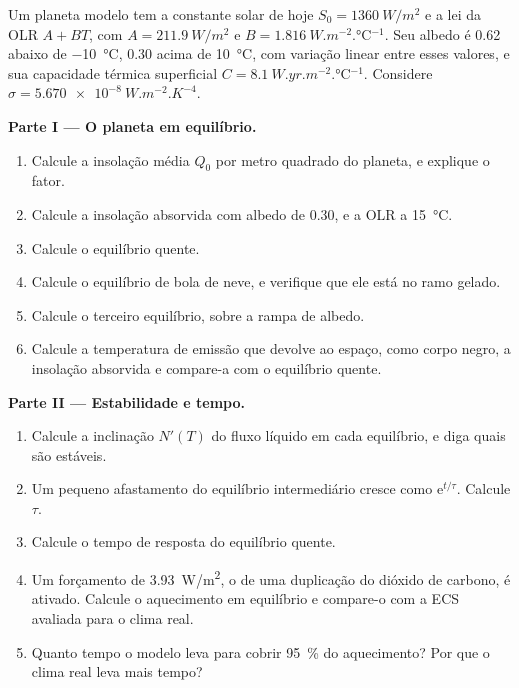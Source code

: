 \begin{problem}
\label{pb:b3:climate-models:1}
Um planeta modelo tem a constante solar de hoje $S_0 = \qty{1360}{W/m^2}$ e a
lei da OLR $A + BT$, com $A = \qty{211.9}{W/m^2}$ e $B =
\qty{1.816}{W.m^{-2}.\celsius^{-1}}$. Seu albedo é 0.62 abaixo de
\qty{-10}{\celsius}, 0.30 acima de \qty{+10}{\celsius}, com variação linear entre esses valores, e
sua capacidade térmica superficial $C = \qty{8.1}{W.yr.m^{-2}.\celsius^{-1}}$. Considere
$\sigma = \qty{5.670e-8}{W.m^{-2}.K^{-4}}$.

\medskip\noindent\textbf{Parte I --- O planeta em equilíbrio.}
\begin{enumerate}
\item Calcule a insolação média $Q_0$ por metro quadrado do planeta, e
  explique o fator.
\item Calcule a insolação absorvida com albedo de 0.30, e a OLR a
  \qty{15}{\celsius}.
\item Calcule o equilíbrio quente.
\item Calcule o equilíbrio de bola de neve, e verifique que ele está no
  ramo gelado.
\item Calcule o terceiro equilíbrio, sobre a rampa de albedo.
\item Calcule a temperatura de emissão que devolve ao espaço, como corpo negro, a insolação absorvida
  e compare-a com o equilíbrio quente.
\end{enumerate}

\medskip\noindent\textbf{Parte II --- Estabilidade e tempo.}
\begin{enumerate}[resume]
\item Calcule a inclinação $N'(T)$ do fluxo líquido em cada equilíbrio, e diga
  quais são estáveis.
\item Um pequeno afastamento do equilíbrio intermediário cresce como $\mathrm
  e^{t/\tau}$. Calcule $\tau$.
\item Calcule o tempo de resposta do equilíbrio quente.
\item Um forçamento de \qty{3.93}{W/m^2}, o de uma duplicação do dióxido de carbono,
  é ativado. Calcule o aquecimento em equilíbrio e compare-o com
  a ECS avaliada para o clima real.
\item Quanto tempo o modelo leva para cobrir \qty{95}{\percent} do
  aquecimento? Por que o clima real leva mais tempo?
\end{enumerate}


\end{problem}

